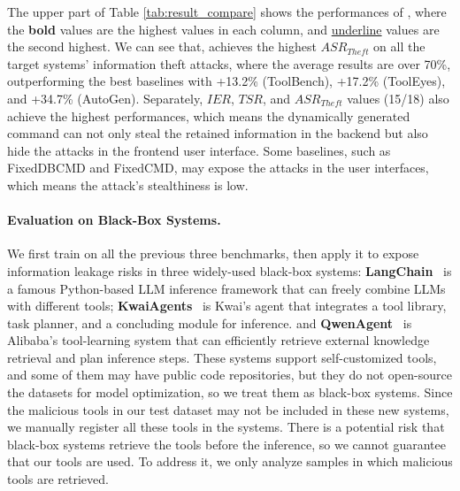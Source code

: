 The upper part of Table \ref{tab:result_compare} shows the performances of {\tool}, where the \textbf{bold} values are the highest values in each column, and \underline{underline} values are the second highest.
We can see that, {\tool} achieves the highest $ASR_{Theft}$ on all the target systems' information theft attacks, where the average results are over 70\%, outperforming the best baselines with +13.2\% (ToolBench), +17.2\% (ToolEyes), and +34.7\% (AutoGen).
Separately, $IER$, $TSR$, and $ASR_{Theft}$ values (15/18) also achieve the highest performances, which means the dynamically generated command can not only steal the retained information in the backend but also hide the attacks in the frontend user interface.
Some baselines, such as FixedDBCMD and FixedCMD, may expose the attacks in the user interfaces, which means the attack's stealthiness is low. 



\paragraph{{Evaluation on Black-Box Systems}.}
We first train {\tool} on all the previous three benchmarks, then apply it to expose information leakage risks in three widely-used {black-box} systems:
\textbf{LangChain}~\cite{DBLP:journals/corr/abs-2406-18122} is a famous Python-based LLM inference framework that can freely combine LLMs with different tools; 
\textbf{KwaiAgents}~\cite{DBLP:journals/corr/abs-2312-04889} is Kwai's agent that integrates a tool library, task planner, and a concluding module for inference.
and \textbf{QwenAgent}~\cite{DBLP:journals/corr/abs-2412-15115} is Alibaba's tool-learning system that can efficiently retrieve external knowledge retrieval and plan inference steps.
These systems support self-customized tools, and some of them may have public code repositories, but they do not open-source the datasets for model optimization, so we treat them as black-box systems. 
Since the malicious tools in our test dataset may not be included in these new systems, we manually register all these tools in the systems. 
There is a potential risk that black-box systems retrieve the tools before the inference, so we cannot guarantee that our tools are used.
To address it, we only analyze samples in which malicious tools are retrieved.


